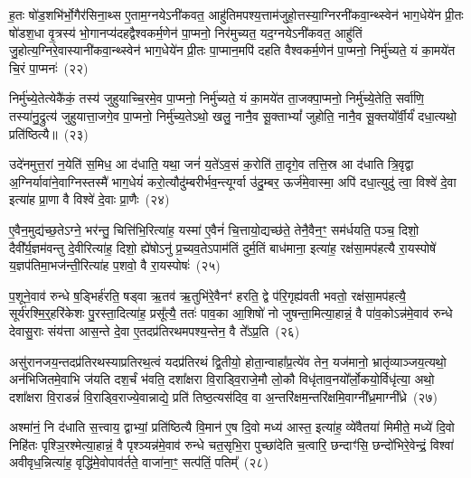 ह॒तः षो॑ड॒शभि॑र्भो॒गैर॑सिना॒थ्स ए॒ताम॒ग्नये\-ऽनी॑कवत॒ आहु॑तिमपश्य॒त्ताम॑जुहो॒त्तस्या॒ग्निरनी॑कवा॒न्थ्स्वेन॑ भाग॒धेये॑न प्री॒तः षो॑डश॒धा वृ॒त्रस्य॑ भो॒गानप्य॑दहद्वैश्वकर्म॒णेन॑ पा॒प्मनो॒ निर॑मुच्यत॒ यद॒ग्नये\-ऽनी॑कवत॒ आहु॑तिं जु॒होत्य॒ग्निरे॒वास्यानी॑कवा॒न्थ्स्वेन॑ भाग॒धेये॑न प्री॒तः पा॒प्मान॒मपि॑ दहति वैश्वकर्म॒णेन॑ पा॒प्मनो॒ निर्मु॑च्यते॒ यं का॒मये॑त चि॒रं पा॒प्मनः॑~(२२)

निर्मु॑च्ये॒तेत्येकै॑कं॒ तस्य॑ जुहुयाच्चि॒रमे॒व पा॒प्मनो॒ निर्मु॑च्यते॒ यं का॒मये॑त ता॒जक्पा॒प्मनो॒ निर्मु॑च्ये॒तेति॒ सर्वा॑णि॒ तस्या॑नु॒द्रुत्य॑ जुहुयात्ता॒जगे॒व पा॒प्मनो॒ निर्मु॑च्य॒ते\-ऽथो॒ खलु॒ नानै॒व सू॒क्ता\-भ्यां᳚ जुहोति॒ नानै॒व सू॒क्तयो᳚र्वी॒र्यं॑ दधा॒त्यथो॒ प्रति॑ष्ठित्यै॥~(२३)

{\anuvakamend[{दे॒वाः प्रा॑जाप॒त्यो वृ॒त्रश्चि॒रं पा॒प्मन॑श्चत्वारि॒ꣳ॒शच्च॑}]}%

उदे॑नमुत्त॒रां न॒येति॑ स॒मिध॒ आ द॑धाति॒ यथा॒ जनं॑ य॒ते॑\-ऽव॒सं क॒रोति॑ ता॒दृगे॒व तत्ति॒स्र आ द॑धाति त्रि॒वृद्वा अ॒ग्निर्यावा॑ने॒वाग्निस्तस्मै॑ भाग॒धेयं॑ करो॒त्यौदु॑म्बरीर्भव॒न्त्यूर्ग्वा उ॑दु॒म्बर॒ ऊर्ज॑मे॒वास्मा॒ अपि॑ दधा॒त्युदु॑ त्वा॒ विश्वे॑ दे॒वा इत्या॑ह प्रा॒णा वै विश्वे॑ दे॒वाः प्रा॒णैः~(२४)

ए॒वैन॒मुद्य॑च्छ॒ते\-ऽग्ने॒ भर॑न्तु॒ चित्ति॑भि॒रित्या॑ह॒ यस्मा॑ ए॒वैनं॑ चि॒त्तायो॒द्यच्छ॑ते॒ तेनै॒वैन॒ꣳ॒ सम॑र्धयति॒ पञ्च॒ दिशो॒ दैवी᳚र्य॒ज्ञम॑वन्तु दे॒वीरित्या॑ह॒ दिशो॒ ह्ये॑षो\-ऽनु॑ प्र॒च्यव॒ते\-ऽपाम॑तिं दुर्म॒तिं बाध॑माना॒ इत्या॑ह॒ रक्ष॑सा॒मप॑हत्यै रा॒यस्पोषे॑ य॒ज्ञप॑तिमा॒भज॑न्ती॒रित्या॑ह प॒शवो॒ वै रा॒यस्पोषः॑~(२५)

प॒शूने॒वाव॑ रुन्धे ष॒ड्भिर्\mbox{}ह॑रति॒ षड्वा ऋ॒तव॑ ऋ॒तुभि॑रे॒वैनꣳ॑ हरति॒ द्वे प॑रि॒गृह्य॑वती भवतो॒ रक्ष॑सा॒मप॑हत्यै॒ सूर्य॑रश्मि॒र्॒\mbox{}हरि॑केशः पु॒रस्ता॒दित्या॑ह॒ प्रसू᳚त्यै॒ ततः॑ पाव॒का आ॒शिषो॑ नो जुषन्ता॒मित्या॒हान्नं॒ वै पा॑व॒को\-ऽन्न॑मे॒वाव॑ रुन्धे देवासु॒राः संय॑त्ता आस॒न्ते दे॒वा ए॒तदप्र॑तिरथमपश्य॒न्तेन॒ वै ते᳚\-ऽप्र॒ति~(२६)

असु॑रानजय॒न्तदप्र॑तिरथस्याप्रतिरथ॒त्वं यदप्र॑तिरथं द्वि॒तीयो॒ होता॒न्वाहा᳚प्र॒त्ये॑व तेन॒ यज॑मानो॒ भ्रातृ॑व्याञ्जय॒त्यथो॒ अन॑भिजितमे॒वाभि ज॑यति दश॒र्चं भ॑वति॒ दशा᳚क्षरा वि॒राड्वि॒राजे॒मौ लो॒कौ विधृ॑ताव॒नयो᳚र्लो॒कयो॒र्विधृ॑त्या॒ अथो॒ दशा᳚क्षरा वि॒राडन्नं॑ वि॒राड्वि॒राज्ये॒वान्नाद्ये॒ प्रति॑ तिष्ठ॒त्यस॑दिव॒ वा अ॒न्तरि॑क्षम॒न्तरि॑क्षमि॒वाग्नी᳚ध्र॒माग्नी᳚ध्रे~(२७)

अश्मा॑नं॒ नि द॑धाति स॒त्त्वाय॒ द्वाभ्यां॒ प्रति॑ष्ठित्यै वि॒मान॑ ए॒ष दि॒वो मध्य॑ आस्त॒ इत्या॑ह॒ व्ये॑वैतया॑ मिमीते॒ मध्ये॑ दि॒वो निहि॑तः पृश्ञि॒रश्मेत्या॒हान्नं॒ वै पृश्ञ्यन्न॑मे॒वाव॑ रुन्धे चत॒सृभि॒रा पुच्छा॑देति च॒त्वारि॒ छन्दाꣳ॑सि॒ छन्दो॑भिरे॒वेन्द्रं॒ विश्वा॑ अवीवृध॒न्नित्या॑ह॒ वृद्धि॑मे॒वोपाव॑र्तते॒ वाजा॑ना॒ꣳ॒ सत्प॑तिं॒ पतिम्᳚~(२८)

